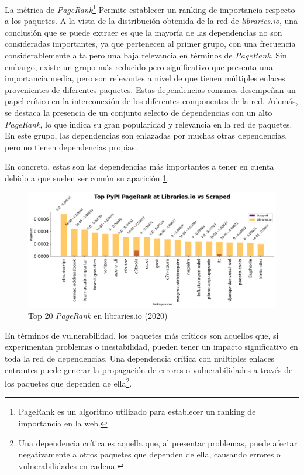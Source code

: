La métrica de \textit{PageRank}\footnote{PageRank es un algoritmo utilizado para establecer un ranking de importancia en la web.}
Permite establecer un ranking de importancia respecto a los paquetes. A la vista de la distribución obtenida de la red
de \textit{libraries.io}, una conclusión que se puede extraer es que la mayoría de las dependencias no son consideradas
importantes, ya que pertenecen al primer grupo, con una frecuencia considerablemente alta pero una baja relevancia en
términos de \textit{PageRank}. Sin embargo, existe un grupo más reducido pero significativo que presenta una importancia
media, pero son relevantes a nivel de que tienen múltiples enlaces provenientes de diferentes paquetes. Estas dependencias
comunes desempeñan un papel crítico en la interconexión de los diferentes componentes de la red. Además, se destaca
la presencia de un conjunto selecto de dependencias con un alto \textit{PageRank}, lo que indica su gran popularidad
y relevancia en la red de paquetes. En este grupo, las dependencias son enlazadas por muchas otras dependencias,
pero no tienen dependencias propias.

En concreto, estas son las dependencias más importantes a tener en cuenta debido a que suelen ser común su
aparición \ref{fig:Top 20 pagerank en libraries.io}.

\begin{figure}[h!]
    \begin{center}
        \includegraphics[width=1\textwidth]{img/pypi/libio_t20_pr_comparison.png}
        \caption{Top 20 \textit{PageRank} en libraries.io (2020)}
        \label{fig:Top 20 pagerank en libraries.io}
    \end{center}
\end{figure}


En términos de vulnerabilidad, los paquetes más críticos son aquellos que, si experimentan problemas o inestabilidad,
pueden tener un impacto significativo en toda la red de dependencias. Una dependencia crítica con múltiples enlaces
entrantes puede generar la propagación de errores o vulnerabilidades a través de los paquetes que dependen de
ella\footnote{Una dependencia crítica es aquella que, al presentar problemas, puede afectar negativamente a
    otros paquetes que dependen de ella, causando errores o vulnerabilidades en cadena.}.

